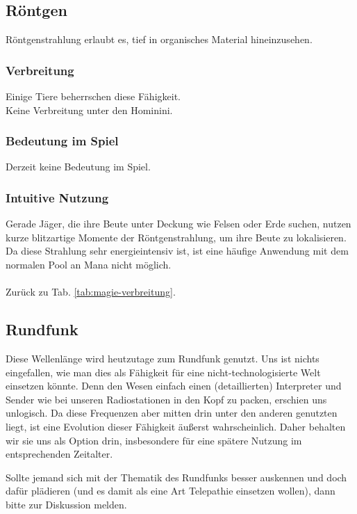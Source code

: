 \subsection{Röntgen}\label{magie:roentgen}
Röntgenstrahlung erlaubt es, tief in organisches Material hineinzusehen. 

\subsubsection{Verbreitung}
Einige Tiere beherrschen diese Fähigkeit. \\
Keine Verbreitung unter den Hominini.

\subsubsection{Bedeutung im Spiel}
Derzeit keine Bedeutung im Spiel.

\subsubsection{Intuitive Nutzung}
Gerade Jäger, die ihre Beute unter Deckung wie Felsen oder Erde suchen, nutzen kurze blitzartige Momente der Röntgenstrahlung, um ihre Beute zu lokalisieren.
Da diese Strahlung sehr energieintensiv ist, ist eine häufige Anwendung mit dem normalen Pool an Mana nicht möglich.
\\ \\
Zurück zu Tab. \ref{tab:magie-verbreitung}.



\subsection{Rundfunk}\label{magie:rundfunk}
Diese Wellenlänge wird heutzutage zum Rundfunk genutzt.
Uns ist nichts eingefallen, wie man dies als Fähigkeit für eine nicht-technologisierte Welt einsetzen könnte.
Denn den Wesen einfach einen (detaillierten) Interpreter und Sender wie bei unseren Radiostationen in den Kopf zu packen, erschien uns unlogisch.
Da diese Frequenzen aber mitten drin unter den anderen genutzten liegt, ist eine Evolution dieser Fähigkeit äußerst wahrscheinlich.
Daher behalten wir sie uns als Option drin, insbesondere für eine spätere Nutzung im entsprechenden Zeitalter.

Sollte jemand sich mit der Thematik des Rundfunks besser auskennen und doch dafür plädieren (und es damit als eine Art Telepathie einsetzen wollen), dann bitte zur Diskussion melden.

